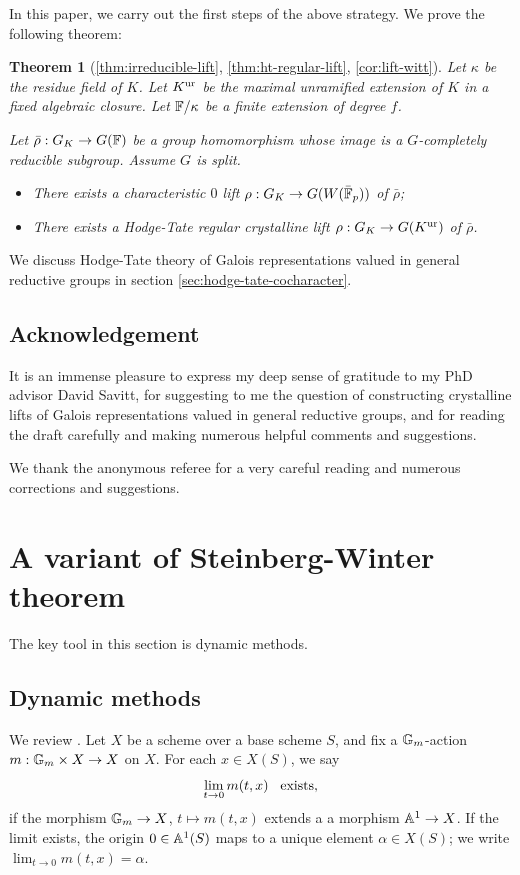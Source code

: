 \documentclass[10pt,a4paper,twoside]{article}
\newtheorem{thm}{Theorem}
\begin{document}
In this paper, we carry out the first steps of the above strategy.
We prove the following theorem:
\begin{thm} [\ref{thm:irreducible-lift}, \ref{thm:ht-regular-lift}, \ref{cor:lift-witt}]
Let $\kappa$ be the residue field of $K$. 
Let $K^{\operatorname{ur}}$ be the maximal unramified extension of $K$ in a fixed algebraic closure.
Let ${\mathbb{F}}/\kappa$ be a finite extension of degree $f$.


Let $\bar \rho : G_K \to G({\mathbb{F}})$ be a group homomorphism whose image is 
a $G$-completely reducible subgroup.
Assume $G$ is split.

\begin{itemize}
\item There exists a characteristic $0$ lift $\rho: G_K\to G(W(\bar{\mathbb{F}}_p))$ of $\bar\rho$;
\item There exists a Hodge-Tate regular crystalline lift $\rho: G_K\to G(K^{\operatorname{ur}})$ of $\bar\rho$.
\end{itemize}
\end{thm}

We discuss Hodge-Tate theory of Galois representations valued in general reductive groups
in section \ref{sec:hodge-tate-cocharacter}.


\subsection*{Acknowledgement}
It is an immense pleasure to express my deep sense of gratitude
to
my PhD advisor David Savitt,
for suggesting to me the question of constructing
    crystalline lifts of Galois representations
    valued in general reductive groups, and
    for reading the draft carefully and making
    numerous helpful comments and suggestions.

We thank the anonymous referee for a very careful reading and numerous corrections and suggestions.



\section{A variant of Steinberg-Winter theorem}


The key tool in this section is dynamic methods.

\subsection{Dynamic methods}
\label{dyn-fil}
We review \cite[Section 4.1]{Crd14}.
Let $X$ be a scheme over a base scheme $S$, and fix a $\mathbb{G}_m$-action 
$m:\mathbb{G}_m\times X \to X$ on $X$.
For each $x\in X(S)$, we say
$$
\lim_{t\to 0} m(t, x) \hspace{3mm}\text{exists,}
$$
if the morphism $\mathbb{G}_m \to X$, $t\mapsto m(t,x)$
extends a a morphism ${\mathbb{A}}^1\to X$.
If the limit exists, the origin $0 \in {\mathbb{A}}^1(S)$ maps
to a unique element $\alpha \in X(S)$;
we write $\lim_{t\to 0} m(t, x) = \alpha$.
\end{document}
